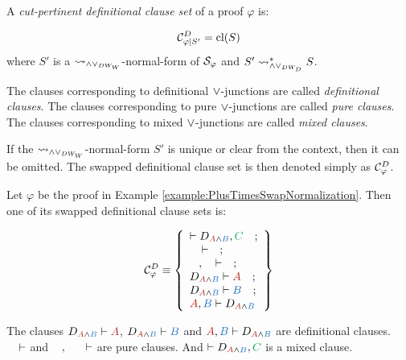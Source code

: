 \begin{definition}
\label{definition:CutPertinentClauseSetSwappedDefinitional}
A \emph{cut-pertinent definitional clause set} of a proof $\varphi$ is:

$$
\mathcal{C}^{D}_{\varphi|S'} = \textrm{cl}(S)
$$
where $S'$ is a $\leadsto_{\wedge\vee_{DW_W}}$-normal-form of $\mathcal{S}_{\varphi}$ and $S' \leadsto_{\wedge\vee_{DW_D}}^* S$.


The clauses corresponding to definitional $\vee$-junctions are called \emph{definitional clauses}. The clauses corresponding to pure $\vee$-junctions are called \emph{pure clauses}. The clauses corresponding to mixed $\vee$-junctions are called \emph{mixed clauses}.

If the $\leadsto_{\wedge\vee_{DW_W}}$-normal-form $S'$ is unique or clear from the context, then it can be omitted. The swapped definitional clause set is then denoted simply as $\mathcal{C}^{D}_{\varphi}$.
\end{definition}

\begin{example}
\label{example:SwappedDefinitionalClauseSet}


Let $\varphi$ be the proof in Example \ref{example:PlusTimesSwapNormalization}. Then one of its swapped definitional clause sets is:

$$
\clausesetSwappedDefinitionalUnique{\varphi} \equiv  \left\{ \begin{array}{l}
	\seq D_{\hA{A} \structplus \hB{B}} , \hE{C} 
\ \ \ ; \\
	\hF{C} \seq 
\ \ \ ; \\
	\hC{B} , \hD{A} \seq
\ \ \ ; \\
	D_{\hA{A} \structplus \hB{B}} \seq \hA{A}  
\ \ \ ; \\
	D_{\hA{A} \structplus \hB{B}} \seq \hB{B} 
\ \ \ ; \\
	\hA{A}, \hB{B} \seq D_{\hA{A} \structplus \hB{B}} 
\end{array} \right\}
$$

The clauses $D_{\hA{A} \structplus \hB{B}} \seq \hA{A}$, $D_{\hA{A} \structplus \hB{B}} \seq \hB{B}$ and 
$\hA{A}, \hB{B} \seq D_{\hA{A} \structplus \hB{B}}$ are definitional clauses. $\hF{C} \seq $ and 
$\hC{B} , \hD{\structdual{A}} \seq$ are pure clauses. And $\seq D_{\hA{A} \structplus \hB{B}} , \hE{C}$ is a mixed clause.
\end{example}


